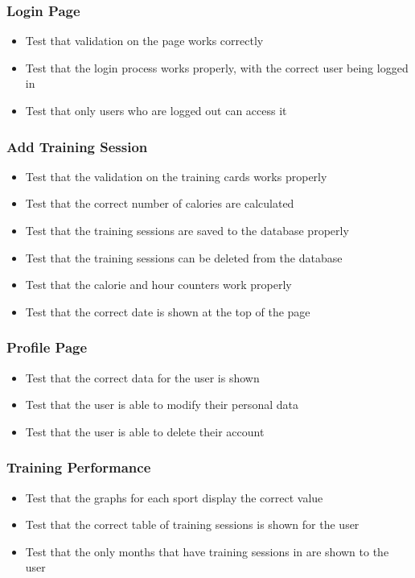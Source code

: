\documentclass{article}[12pt,a4paper]
\begin{document}
\subsubsection{Login Page}
\begin{itemize}
  \item Test that validation on the page works correctly
  \item Test that the login process works properly, with the correct user being logged in
  \item Test that only users who are logged out can access it
\end{itemize}

\subsubsection{Add Training Session}
\begin{itemize}
  \item Test that the validation on the training cards works properly
  \item Test that the correct number of calories are calculated
  \item Test that the training sessions are saved to the database properly
  \item Test that the training sessions can be deleted from the database
  \item Test that the calorie and hour counters work properly
  \item Test that the correct date is shown at the top of the page
\end{itemize}

\subsubsection{Profile Page}
\begin{itemize}
  \item Test that the correct data for the user is shown
  \item Test that the user is able to modify their personal data
  \item Test that the user is able to delete their account
\end{itemize}

\subsubsection{Training Performance}
\begin{itemize}
  \item Test that the graphs for each sport display the correct value
  \item Test that the correct table of training sessions is shown for the user
  \item Test that the only months that have training sessions in are shown to the user
\end{itemize}
\end{document}
